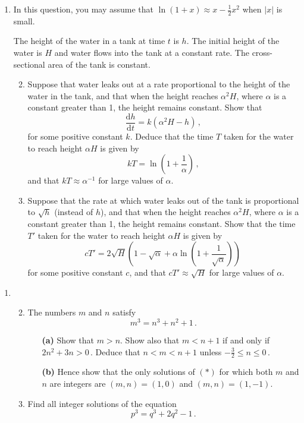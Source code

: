 \documentclass[a4, 11pt]{report}
\newlength{\qspace}
\newcounter{qnumber}
\newenvironment{question}%
 {\vspace{\qspace}
  \begin{enumerate}[\bfseries 1\quad][10]%
    \setcounter{enumi}{\value{qnumber}}%
    \item%
 }
{
  \end{enumerate}
  \filbreak
  \stepcounter{qnumber}
 }
\newenvironment{questionparts}[1][1]%
 {
  \begin{enumerate}[\bfseries (i)]%
    \setcounter{enumii}{#1}
    \addtocounter{enumii}{-1}
    \setlength{\itemsep}{5mm}
    \setlength{\parskip}{8pt}
 }
 {
  \end{enumerate}
 }
\def\d{{\mathrm d}}
\def\le{\leqslant}
\begin{document}
\begin{question}
In this question, you may assume that $\ln (1+x) \approx x -\frac12 x^2$
when $\vert x \vert $ is small.

The height of the water in a tank at time $t$  is $h$. 
The initial height of the water 
is $H$ and
water flows   into the tank  at a constant rate.
The cross-sectional area of the 
tank is constant. 


\begin{questionparts}
\item 
Suppose
that water leaks out 
at a rate proportional to the height of the water in the tank,
and that when the height
 reaches $\alpha^2 H$, where $\alpha$ is a constant greater than 1,
the height remains constant. 
Show that
\[
\frac {\d h}{\d t } = k( \alpha^2 H -h)\,,
\]
for some positive constant $k$. Deduce
that
the time $T$ taken for the water to reach height $\alpha H$
is given by 
\[
kT = \ln \left(1+\frac1\alpha\right)\,,
\]
and that $kT\approx \alpha^{-1}$ for large values of $\alpha$.  

\item Suppose  that  the rate at which water leaks out of  the 
tank is proportional to $\sqrt h$ (instead of $h$),
and that when the height
 reaches $\alpha^2 H$, where $\alpha$ is a constant greater than 1,
the height remains constant. 
 Show that 
the time $T'$ taken for the water to reach height $\alpha H$ is
given by
\[
cT'=2\sqrt H \left( 1 - \sqrt\alpha +\alpha \ln
\left(1+\frac1 {\sqrt\alpha} \right)\right)\,
\]
 for some positive constant $c$,
and that $ cT'\approx \sqrt H$ for large values of $\alpha$. 
\end{questionparts} 
\end{question}
		
\begin{question}
\begin{questionparts}
\item
The numbers $m$ and $n$ satisfy
\[
m^3=n^3+n^2+1\,.
\tag{$*$}
\]

\begin{itemize}\setlength{\labelsep}{3.5 mm}
\item[{\bf (a)}]
Show that $m>n$. Show also that 
 $m<n+1$ if and only if $2n^2+3n>0\,$. 
Deduce that $n<m<n+1$ unless $-\frac32 \le n \le 0\,$.

\item[{\bf (b)}] 
Hence show that the only solutions of $(*)$ for which both $m$ and 
$n$ are integers are $(m,n) = (1,0)$ and $(m,n)= (1,-1)$.

\end{itemize}        
\item
Find all integer solutions of the equation
\[
p^3=q^3+2q^2-1\,.
\]
\end{questionparts}
\end{question}	
		
\end{document}
